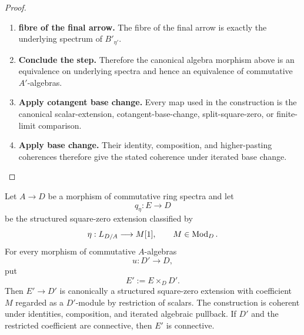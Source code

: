 \begin{proof}
\begin{enumerate}[label=\textup{(\arabic*)}]
    \item \textbf{fibre of the final arrow.}
    The fibre of the final arrow is exactly the underlying spectrum of \(B'_{\eta'}\).

    \item \textbf{Conclude the step.}
    Therefore the canonical algebra morphism above is an equivalence on underlying spectra and
    hence an equivalence of commutative \(A'\)-algebras.

    \item \textbf{Apply cotangent base change.}
    Every map used in the construction is the canonical scalar-extension, cotangent-base-change,
    split-square-zero, or finite-limit comparison.

    \item \textbf{Apply base change.}
    Their identity, composition, and higher-pasting coherences therefore give the stated
    coherence under iterated base change.
\end{enumerate}
\end{proof}



\begin{lemma}
\label{lem:structured-square-zero-cartesian-pullback}
Let \(A\to D\) be a morphism of commutative ring spectra and let
\[
    q_\eta:E\longrightarrow D
\]
be the structured square-zero extension classified by
\[
    \eta:L_{D/A}\longrightarrow M[1],
    \qquad M\in\operatorname{Mod}_D.
\]
For every morphism of commutative \(A\)-algebras
\[
    u:D'\longrightarrow D,
\]
put
\[
    E':=E\times_DD'.
\]
Then \(E'\to D'\) is canonically a structured square-zero extension with
coefficient \(M\) regarded as a \(D'\)-module by restriction of scalars. The
construction is coherent under identities, composition, and iterated
algebraic pullback. If \(D'\) and the restricted coefficient are connective,
then \(E'\) is connective.
\end{lemma}

